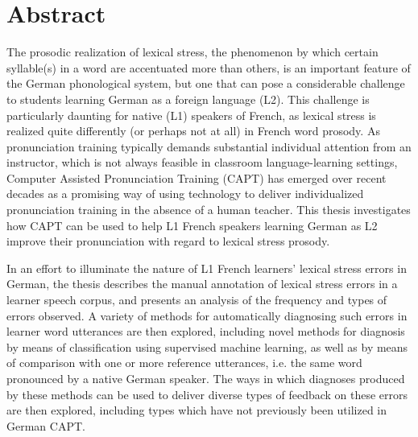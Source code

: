 %
\chapter*{Abstract}
\label{sec:abstract}
\vspace*{-10mm}

The prosodic realization of lexical stress, the phenomenon by which certain syllable(s) in a word are accentuated more than others, is an important feature of the German phonological system, but one that can pose a considerable challenge to students learning German as a foreign language (L2). This challenge is particularly daunting for native (L1) speakers of French, as lexical stress is realized quite differently (or perhaps not at all) in French word prosody.
As pronunciation training typically demands substantial individual attention from an instructor, which is not always feasible in classroom language-learning settings, Computer Assisted Pronunciation Training (CAPT) has emerged over recent decades as a promising way of using technology to deliver individualized pronunciation training in the absence of a human teacher.
This thesis investigates how CAPT can be used to help L1 French speakers learning German as L2 improve their pronunciation with regard to lexical stress prosody.

In an effort to illuminate the nature of L1 French learners' lexical stress errors in German, the thesis 
describes the manual annotation of lexical stress errors in a learner speech corpus,
and presents an analysis of the frequency and types of errors observed.
A variety of methods for automatically diagnosing such errors in learner word utterances are then explored, including novel methods for diagnosis by means of classification using supervised machine learning, as well as by means of comparison with one or more reference utterances, i.e. the same word pronounced by a native German speaker.
The ways in which diagnoses produced by these methods can be used to deliver diverse types of feedback on these errors are then explored, including types which have not previously been utilized in German CAPT. 

